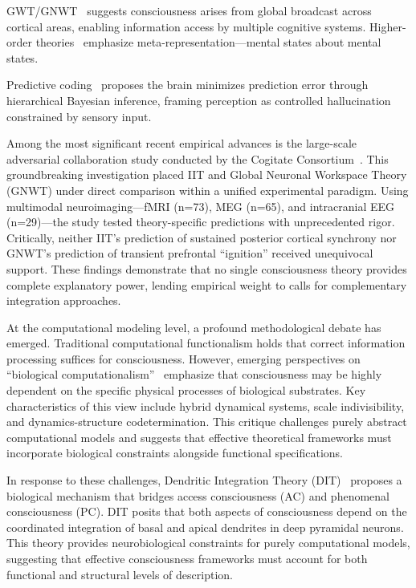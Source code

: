 \documentclass[10pt,journal,compsoc]{IEEEtran}
\begin{document}
GWT/GNWT~\cite{baars2005,dehaene2011} suggests consciousness arises from global broadcast across cortical areas, enabling information access by multiple cognitive systems. Higher-order theories~\cite{rosenthal2005} emphasize meta-representation—mental states about mental states.

Predictive coding~\cite{friston2010} proposes the brain minimizes prediction error through hierarchical Bayesian inference, framing perception as controlled hallucination constrained by sensory input.

Among the most significant recent empirical advances is the large-scale adversarial collaboration study conducted by the Cogitate Consortium~\cite{Melloni2025, Storm2024}. This groundbreaking investigation placed IIT and Global Neuronal Workspace Theory (GNWT) under direct comparison within a unified experimental paradigm. Using multimodal neuroimaging—fMRI (n=73), MEG (n=65), and intracranial EEG (n=29)—the study tested theory-specific predictions with unprecedented rigor. Critically, neither IIT's prediction of sustained posterior cortical synchrony nor GNWT's prediction of transient prefrontal ``ignition'' received unequivocal support. These findings demonstrate that no single consciousness theory provides complete explanatory power, lending empirical weight to calls for complementary integration approaches.

At the computational modeling level, a profound methodological debate has emerged. Traditional computational functionalism holds that correct information processing suffices for consciousness. However, emerging perspectives on ``biological computationalism''~\cite{Milinkovic2025} emphasize that consciousness may be highly dependent on the specific physical processes of biological substrates. Key characteristics of this view include hybrid dynamical systems, scale indivisibility, and dynamics-structure codetermination. This critique challenges purely abstract computational models and suggests that effective theoretical frameworks must incorporate biological constraints alongside functional specifications.

In response to these challenges, Dendritic Integration Theory (DIT)~\cite{Bachmann2020, Aru2020} proposes a biological mechanism that bridges access consciousness (AC) and phenomenal consciousness (PC). DIT posits that both aspects of consciousness depend on the coordinated integration of basal and apical dendrites in deep pyramidal neurons. This theory provides neurobiological constraints for purely computational models, suggesting that effective consciousness frameworks must account for both functional and structural levels of description.
\end{document}
